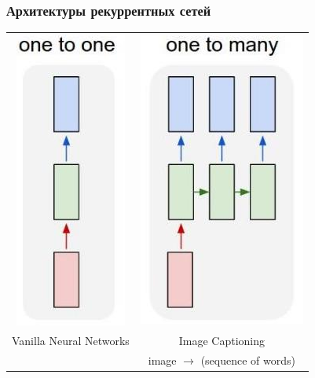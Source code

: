 \documentclass[fullscreen=true, bookmarks=true, hyperref={pdfencoding=unicode}]{beamer}
\begin{document}
\begin{frame}
  \frametitle{Архитектуры рекуррентных сетей}
  \begin{tabular}{cc}
    \includegraphics[keepaspectratio,
                     width=0.2\paperwidth]{one-to-one.jpg} &
    \includegraphics[keepaspectratio,
                     width=0.3\paperwidth]{one-to-many.jpg} \\
    Vanilla Neural Networks & Image Captioning \\
     & image $\to$ (sequence of words)
  \end{tabular}
\end{frame}
\end{document}
